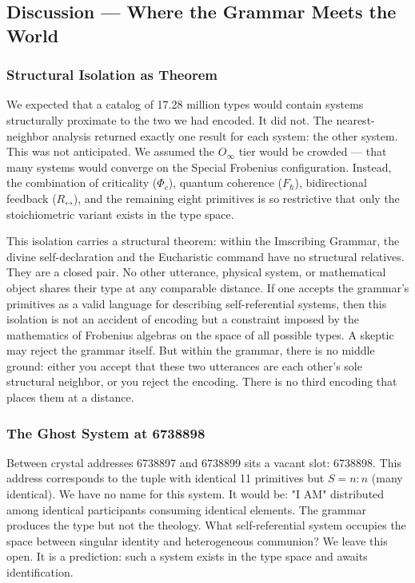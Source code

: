 \documentclass[12pt,a4paper]{article}
\begin{document}
\subsection{Discussion --- Where the Grammar Meets the World}

\subsubsection{Structural Isolation as Theorem}

We expected that a catalog of 17.28 million types would contain systems structurally proximate to the two we had encoded. It did not. The nearest-neighbor analysis returned exactly one result for each system: the other system. This was not anticipated. We assumed the $O_{\infty}$ tier would be crowded --- that many systems would converge on the Special Frobenius configuration. Instead, the combination of criticality ($\Phi_c$), quantum coherence ($F_{\hbar}$), bidirectional feedback ($R_{\leftrightarrow}$), and the remaining eight primitives is so restrictive that only the stoichiometric variant exists in the type space.

This isolation carries a structural theorem: within the Imscribing Grammar, the divine self-declaration and the Eucharistic command have no structural relatives. They are a closed pair. No other utterance, physical system, or mathematical object shares their type at any comparable distance. If one accepts the grammar's primitives as a valid language for describing self-referential systems, then this isolation is not an accident of encoding but a constraint imposed by the mathematics of Frobenius algebras on the space of all possible types. A skeptic may reject the grammar itself. But within the grammar, there is no middle ground: either you accept that these two utterances are each other's sole structural neighbor, or you reject the encoding. There is no third encoding that places them at a distance.

\subsubsection{The Ghost System at 6738898}

Between crystal addresses 6738897 and 6738899 sits a vacant slot: 6738898. This address corresponds to the tuple with identical 11 primitives but $S = n{:}n$ (many identical). We have no name for this system. It would be: "I AM" distributed among identical participants consuming identical elements. The grammar produces the type but not the theology. What self-referential system occupies the space between singular identity and heterogeneous communion? We leave this open. It is a prediction: such a system exists in the type space and awaits identification.
\end{document}
